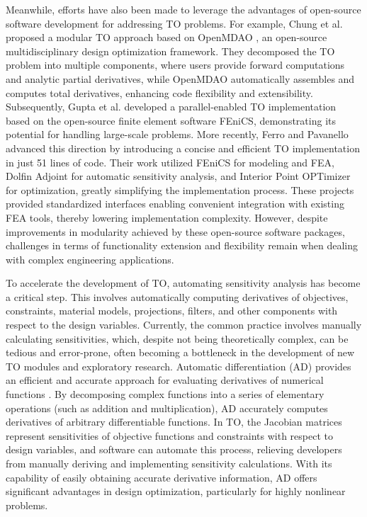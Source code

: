 \documentclass[mathpazo]{cicp}
\begin{document}
Meanwhile, efforts have also been made to leverage the advantages of open-source software development for addressing TO problems. For example, Chung et al.\cite{chung2019topology} proposed a modular TO approach based on OpenMDAO \cite{gray2019openmdao}, an open-source multidisciplinary design optimization framework. They decomposed the TO problem into multiple components, where users provide forward computations and analytic partial derivatives, while OpenMDAO automatically assembles and computes total derivatives, enhancing code flexibility and extensibility. Subsequently, Gupta et al.\cite{gupta202055} developed a parallel-enabled TO implementation based on the open-source finite element software FEniCS\cite{alnaes2015fenics}, demonstrating its potential for handling large-scale problems. More recently, Ferro and Pavanello\cite{ferro2023simple} advanced this direction by introducing a concise and efficient TO implementation in just 51 lines of code. Their work utilized FEniCS for modeling and FEA, Dolfin Adjoint for automatic sensitivity analysis, and Interior Point OPTimizer for optimization, greatly simplifying the implementation process. These projects provided standardized interfaces enabling convenient integration with existing FEA tools, thereby lowering implementation complexity. However, despite improvements in modularity achieved by these open-source software packages, challenges in terms of functionality extension and flexibility remain when dealing with complex engineering applications.

To accelerate the development of TO, automating sensitivity analysis has become a critical step. This involves automatically computing derivatives of objectives, constraints, material models, projections, filters, and other components with respect to the design variables. Currently, the common practice involves manually calculating sensitivities, which, despite not being theoretically complex, can be tedious and error-prone, often becoming a bottleneck in the development of new TO modules and exploratory research. Automatic differentiation (AD) provides an efficient and accurate approach for evaluating derivatives of numerical functions \cite{griewank2008evaluating}. By decomposing complex functions into a series of elementary operations (such as addition and multiplication), AD accurately computes derivatives of arbitrary differentiable functions. In TO, the Jacobian matrices represent sensitivities of objective functions and constraints with respect to design variables, and software can automate this process, relieving developers from manually deriving and implementing sensitivity calculations. With its capability of easily obtaining accurate derivative information, AD offers significant advantages in design optimization, particularly for highly nonlinear problems.
\end{document}
